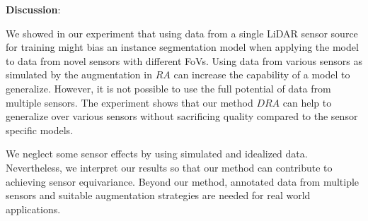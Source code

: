 \textbf{Discussion}:

We showed in our experiment that using data from a single LiDAR sensor source for training might bias an instance segmentation model when applying the model to data from novel sensors with different FoVs. 
Using data from various sensors as simulated by the augmentation in $RA$ can increase the capability of a model to generalize. However, it is not possible to use the full potential of data from multiple sensors. The experiment shows that our method $DRA$ can help to generalize over various sensors without sacrificing quality compared to the sensor specific models.

We neglect some sensor effects by using simulated and idealized data. Nevertheless, we interpret our results so that our method can contribute to achieving sensor equivariance. Beyond our method, annotated data from multiple sensors and suitable augmentation strategies are needed for real world applications. 



